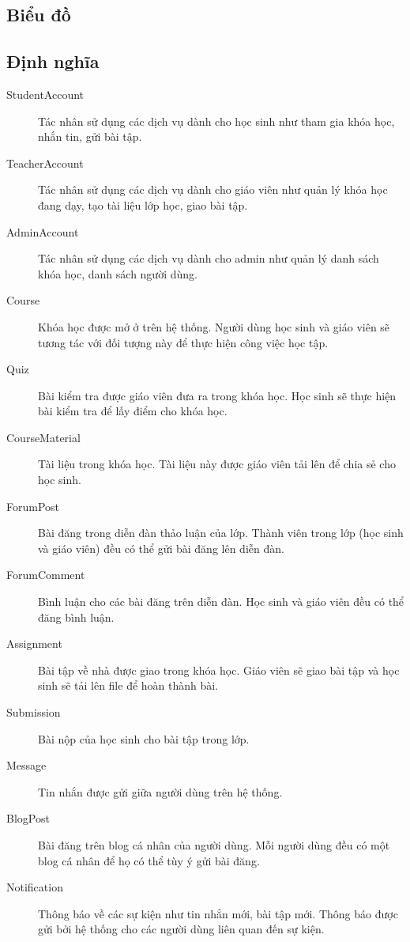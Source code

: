 \documentclass[./../main_file.tex]{subfiles}
\begin{document}
	\subsection{Biểu đồ}
	\subsection{Định nghĩa}
	\begin{description}
		\item[StudentAccount] Tác nhân sử dụng các dịch vụ dành cho học sinh như tham gia khóa học, nhắn tin, gửi bài tập.
		\item[TeacherAccount] Tác nhân sử dụng các dịch vụ dành cho giáo viên như quản lý khóa học đang dạy, tạo tài liệu lớp học, giao bài tập.
		\item[AdminAccount] Tác nhân sử dụng các dịch vụ dành cho admin như quản lý danh sách khóa học, danh sách người dùng.
		\item[Course] Khóa học được mở ở trên hệ thống. Người dùng học sinh và giáo viên sẽ tương tác với đối tượng này để thực hiện công việc học tập.
		\item[Quiz] Bài kiểm tra được giáo viên đưa ra trong khóa học. Học sinh sẽ thực hiện bài kiểm tra để lấy điểm cho khóa học.
		\item[CourseMaterial] Tài liệu trong khóa học. Tài liệu này được giáo viên tải lên để chia sẻ cho học sinh.
		\item[ForumPost] Bài đăng trong diễn đàn thảo luận của lớp. Thành viên trong lớp (học sinh và giáo viên) đều có thể gửi bài đăng lên diễn đàn.
		\item[ForumComment] Bình luận cho các bài đăng trên diễn đàn. Học sinh và giáo viên đều có thể đăng bình luận.
		\item[Assignment] Bài tập về nhà được giao trong khóa học. Giáo viên sẽ giao bài tập và học sinh sẽ tải lên file để hoàn thành bài.
		\item[Submission] Bài nộp của học sinh cho bài tập trong lớp.
		\item[Message] Tin nhắn được gửi giữa người dùng trên hệ thống.
		\item[BlogPost] Bài đăng trên blog cá nhân của người dùng. Mỗi người dùng đều có một blog cá nhân để họ có thể tùy ý gửi bài đăng.
		\item[Notification] Thông báo về các sự kiện như tin nhắn mới, bài tập mới. Thông báo được gửi bởi hệ thống cho các người dùng liên quan đến sự kiện.
		
	\end{description}
	
\end{document}
